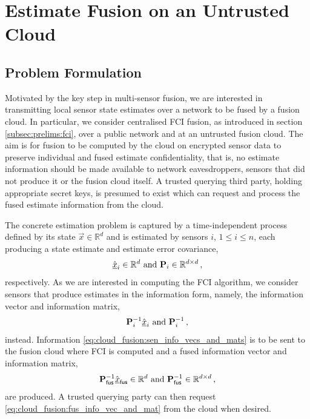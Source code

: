
\chapter{Estimate Fusion on an Untrusted Cloud}\label{ch:cloud_fusion}

% 
%                                              
%                                              
%                                              
% 

\section{Problem Formulation}\label{sec:cloud_fusion:problem}
Motivated by the key step in multi-sensor fusion, we are interested in transmitting local sensor state estimates over a network to be fused by a fusion cloud. In particular, we consider centralised FCI fusion, as introduced in section \ref{subsec:prelims:fci}, over a public network and at an untrusted fusion cloud. The aim is for fusion to be computed by the cloud on encrypted sensor data to preserve individual and fused estimate confidentiality, that is, no estimate information should be made available to network eavesdroppers, sensors that did not produce it or the fusion cloud itself. A trusted querying third party, holding appropriate secret keys, is presumed to exist which can request and process the fused estimate information from the cloud.

The concrete estimation problem is captured by a time-independent process defined by its state $\vec{x} \in \mathbb{R}^d$ and is estimated by sensors $i$, $1\leq i\leq n$, each producing a state estimate and estimate error covariance,
\begin{equation}
    \hat{{\underline{x}}}_i \in \mathbb{R}^d \text{ and } {\ensuremath{{\mathbf{P}}}}_i \in \mathbb{R}^{d\times d}\,,
\end{equation}
respectively. As we are interested in computing the FCI algorithm, we consider sensors that produce estimates in the information form, namely, the information vector and information matrix,
\begin{equation}\label{eq:cloud_fusion:sen_info_vecs_and_mats}
    {\ensuremath{{\mathbf{P}}}}_i^{-1}\hat{{\underline{x}}}_i \text{ and } {\ensuremath{{\mathbf{P}}}}_i^{-1}\,,
\end{equation}
instead. Information \eqref{eq:cloud_fusion:sen_info_vecs_and_mats} is to be sent to the fusion cloud where FCI is computed and a fused information vector and information matrix,
\begin{equation}\label{eq:cloud_fusion:fus_info_vec_and_mat}
    {\ensuremath{{\mathbf{P}}}}_{\mathsf{fus}}^{-1}\hat{{\underline{x}}}_{\mathsf{fus}} \in \mathbb{R}^d \text{ and } {\ensuremath{{\mathbf{P}}}}_{\mathsf{fus}}^{-1} \in \mathbb{R}^{d\times d}\,,
\end{equation}
are produced. A trusted querying party can then request \eqref{eq:cloud_fusion:fus_info_vec_and_mat} from the cloud when desired.

